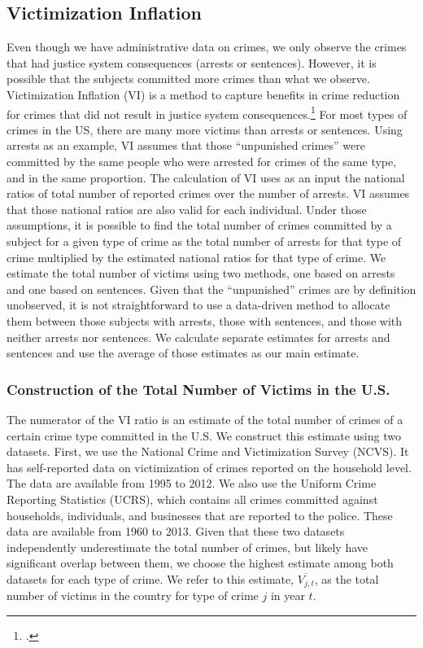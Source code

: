 \subsection{Victimization Inflation}
\noindent Even though we have administrative data on crimes, we only observe the crimes that had justice system consequences (arrests or sentences). However, it is possible that the subjects committed more crimes than what we observe. Victimization Inflation (VI) is a method to capture benefits in crime reduction for crimes that did not result in justice system consequences.\footnote{\citet{Belfield_Nores_etal_2006_JHR,Heckman_Moon_etal_2010_RateofReturn}.} For most types of crimes in the US, there are many more victims than arrests or sentences. Using arrests as an example, VI assumes that those ``unpunished crimes'' were committed by the same people who were arrested for crimes of the same type, and in the same proportion. The calculation of VI uses as an input the national ratios of total number of reported crimes over the number of arrests. VI assumes that those national ratios are also valid for each individual. Under those assumptions, it is possible to find the total number of crimes committed by a subject for a given type of crime as the total number of arrests for that type of crime multiplied by the estimated national ratios for that type of crime. We estimate the total number of victims using two methods, one based on arrests and one based on sentences. Given that the ``unpunished'' crimes are by definition unobserved, it is not straightforward to use a data-driven method to allocate them between those subjects with arrests, those with sentences, and those with neither arrests nor sentences. We calculate separate estimates for arrests and sentences and use the average of those estimates as our main estimate. \\

\subsubsection{Construction of the Total Number of Victims in the U.S.}

\noindent The numerator of the VI ratio is an estimate of the total number of crimes of a certain crime type committed in the U.S. We construct this estimate using two datasets. First, we use the National Crime and Victimization Survey (NCVS). It has self-reported data on victimization of crimes reported on the household level. The data are available from 1995 to 2012. We also use the Uniform Crime Reporting Statistics (UCRS), which contains all crimes committed against households, individuals, and businesses that are reported to the police. These data are available from 1960 to 2013. Given that these two datasets independently underestimate the total number of crimes, but likely have significant overlap between them, we choose the highest estimate among both datasets for each type of crime. We refer to this estimate, $\overline{V_{j,t}}$, as the total number of victims in the country for type of crime $j$ in year $t$. \\

